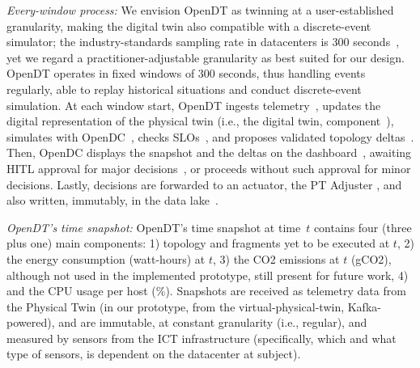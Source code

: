 \textit{Every-window process:} We envision OpenDT as twinning at a user-established granularity, making the digital twin also compatible with a discrete-event simulator; the industry-standards sampling rate in datacenters is 300 seconds~\cite{DBLP:conf/ccgrid/MastenbroekAJLB21, DBLP:journals/fgcs/MastenbroekMBI25}, yet we regard a practitioner-adjustable granularity as best suited for our design. OpenDT operates in fixed windows of 300 seconds, thus handling events regularly, able to replay historical situations and conduct discrete-event simulation. At each window start, OpenDT ingests telemetry~, updates the digital representation of the physical twin (i.e., the digital twin, component~), simulates with OpenDC~, checks SLOs~, and proposes validated topology deltas~. Then, OpenDC displays the snapshot and the deltas on the dashboard~, awaiting HITL approval for major decisions~, or proceeds without such approval for minor decisions. Lastly, decisions are forwarded to an actuator, the PT Adjuster , and also written, immutably, in the data lake~. 

\textit{OpenDT's time snapshot:} OpenDT's time snapshot at time~$t$ contains four (three plus one) main components: 1) topology and fragments yet to be executed at $t$, 2) the energy consumption (watt-hours) at $t$, 3) the CO2 emissions at $t$ (gCO2), although not used in the implemented prototype, still present for future work, 4) and the CPU usage per host (\%). Snapshots are received as telemetry data from the Physical Twin (in our prototype, from the virtual-physical-twin, Kafka-powered), and are immutable, at constant granularity (i.e., regular), and measured by sensors from the ICT infrastructure (specifically, which and what type of sensors, is dependent on the datacenter at subject).





